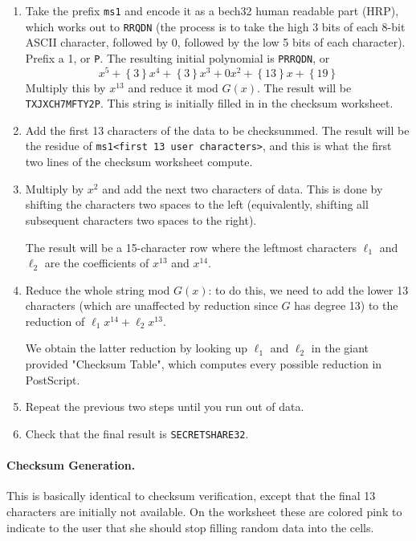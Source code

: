 \documentclass[letterpaper]{article}
\theoremstyle{xxx}
\theoremstyle{evil}
\theoremstyle{yyy}
\theoremstyle{plain}
\theoremstyle{zzz}
\newcommand{\binrep}[1]{\left\{#1\right\}}
\newcommand{\vc}[1]{\texttt{#1}} %
\begin{document}
\begin{enumerate}
\item Take the prefix \vc{ms1} and encode it as a bech32 human readable part (HRP),
which works out to \vc{RRQDN} (the process is to take the high 3 bits of each
8-bit ASCII character, followed by 0, followed by the low 5 bits of each character).
Prefix a 1, or \vc{P}. The resulting initial polynomial is \vc{PRRQDN}, or
\[ x^5 + \binrep{3}x^4 + \binrep{3}x^3 + 0x^2 + \binrep{13}x + \binrep{19} \]
Multiply this by $x^{13}$ and reduce it mod $G(x)$. The result will be
\vc{TXJXCH7MFTY2P}. This string is initially filled in in the checksum
worksheet.

\item Add the first 13 characters of the data to be checksummed. The result will
be the residue of \vc{ms1<first 13 user characters>}, and this is what the
first two lines of the checksum worksheet compute.

\item Multiply by $x^2$ and add the next two characters of data. This is done by
shifting the characters two spaces to the left (equivalently, shifting all
subsequent characters two spaces to the right).

The result will be a 15-character row where the leftmost characters $\ell_1$
and $\ell_2$ are the coefficients of $x^{13}$ and $x^{14}$.

\item Reduce the whole string mod $G(x)$: to do this, we need to add the lower
13 characters (which are unaffected by reduction since $G$ has degree 13) to
the reduction of $\ell_1x^{14} + \ell_2x^{13}$.

We obtain the latter reduction by looking up $\ell_1$ and $\ell_2$ in the
giant provided "Checksum Table", which computes every possible reduction
in PostScript.

\item Repeat the previous two steps until you run out of data.
\item Check that the final result is \vc{SECRETSHARE32}.
\end{enumerate}

\paragraph{Checksum Generation.} This is basically identical to checksum verification,
except that the final 13 characters are initially not available. On the worksheet these
are colored pink to indicate to the user that she should stop filling random data into
the cells.
\end{document}
